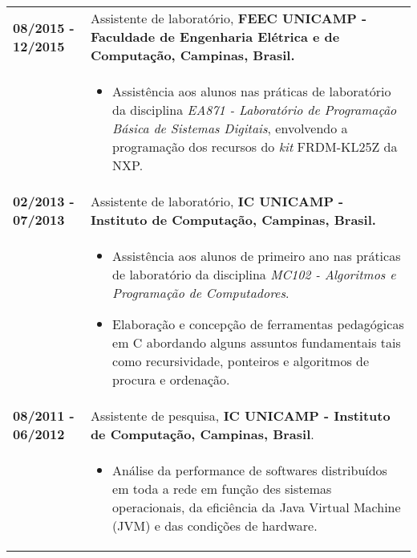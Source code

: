 \documentclass[10pt, a4paper]{article}
\begin{document}
\begin{tabular}{p{} p{}}
\textbf{08/2015 - 12/2015}  & Assistente de laboratório, \textbf{FEEC
UNICAMP - Faculdade de Engenharia Elétrica e de Computação, Campinas, Brasil.}
\\
& \vspace{-12pt}
\begin{itemize}
  \item Assistência aos alunos nas práticas de laboratório da
  disciplina \textit{EA871 - Laboratório de Programação Básica de Sistemas
  Digitais}, envolvendo a programação dos recursos do \textit{kit} FRDM-KL25Z
  da NXP.
  
\end{itemize}\\


\textbf{02/2013 - 07/2013}   & Assistente de laboratório, \textbf{IC
UNICAMP - Instituto de Computação, Campinas, Brasil.} \\
& \vspace{-12pt}
\begin{itemize}
  \item Assistência aos alunos de primeiro ano nas práticas de laboratório da
  disciplina \textit{MC102 - Algoritmos e Programação de Computadores}.
  \vspace{-8pt}
  \item Elaboração e concepção de ferramentas pedagógicas em C
  abordando alguns assuntos fundamentais tais como recursividade, ponteiros e
  algoritmos de procura e ordenação.
\end{itemize}\\

\textbf{08/2011 - 06/2012} & Assistente de pesquisa, \textbf{IC UNICAMP -
Instituto de Computação, Campinas, Brasil}. \\
& \vspace{-12pt}
\begin{itemize}
  \item Análise da performance de softwares distribuídos em toda a rede em
  função des sistemas operacionais, da eficiência da Java Virtual Machine (JVM)
  e das condições de hardware.
\end{itemize}
\\



\end{tabular}
\end{document}
